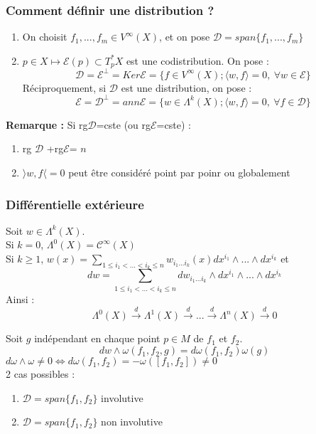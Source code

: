 \subsubsection{Comment définir une distribution ?}
\begin{enumerate}
	\item On choisit $f_1,...,f_m\in V^\infty(X)$, et on pose $\mathcal{D}=span\{f_1,...,f_m\}$
	\item $p\in X\mapsto \mathscr{E}(p)\subset T_p^* X$ est une codistribution. On pose :
\[\mathcal{D}=\mathscr{E}^\perp = Ker\mathscr{E}=\{f\in V^\infty(X); \langle w,f\rangle =0,\ \forall w\in\mathscr{E}\}\]
Réciproquement, si $\mathcal{D}$ est une distribution, on pose :
\[\mathscr{E}=\mathcal{D}^\perp=ann\mathscr{E}=\{w\in\Lambda^k(X); \langle w,f\rangle =0,\ \forall f\in\mathcal{D}\}\]
\end{enumerate}

\textbf{Remarque :} Si rg$\mathcal{D}$=cste (ou rg$\mathscr{E}$=cste) :
\begin{enumerate}
	\item rg $\mathcal{D}$ +rg$\mathscr{E}$= $n$
	\item $\rangle w,f\langle=0$ peut être considéré point par poinr ou globalement
\end{enumerate}

\subsubsection{Différentielle extérieure}

Soit $w\in\Lambda^k(X)$.\\
Si $k=0$, $\Lambda^0(X)=\mathscr{C}^\infty(X)$ \\
Si $k\geq 1$, $w(x)=\sum_{1\leq i_1<...<i_k\leq n} w_{i_1...i_k}(x)dx^{i_1}\wedge...\wedge dx^{i_k}$ et
\[dw=\sum_{1\leq i_1<...<i_k\leq n} dw_{i_1...i_k}\wedge dx^{i_1}\wedge...\wedge dx^{i_k}\]
Ainsi :
\[\Lambda^0(X)\xrightarrow{d}\Lambda^1(X)\xrightarrow{d}...\xrightarrow{d}\Lambda^n(X)\xrightarrow{d} 0\]



Soit $g$ indépendant en chaque point $p\in M$ de $f_1$ et $f_2$.
\[dw\wedge \omega(f_1,f_2,g)=d\omega (f_1,f_2)\omega(g)\]
$d\omega\wedge\omega\neq 0 \Leftrightarrow d\omega(f_1,f_2)=-\omega([f_1,f_2])\neq 0$\\
2 cas possibles :
\begin{enumerate}
	\item $\mathcal{D}=span\{f_1,f_2\}$ involutive
	\item $\mathcal{D}=span\{f_1,f_2\}$ non involutive
\end{enumerate}

